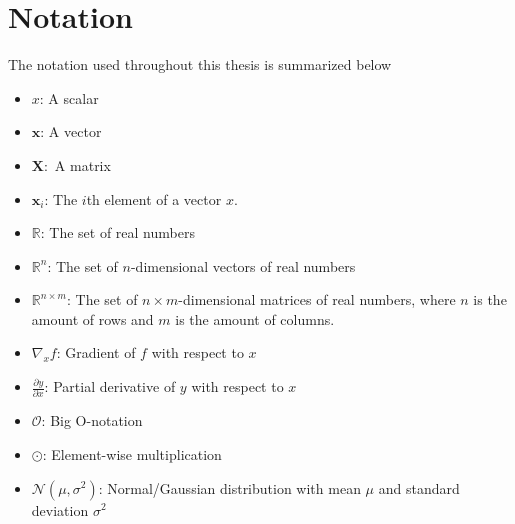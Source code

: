 \documentclass[./main.tex]{subfiles}
\begin{document}
\section{Notation}
The notation used throughout this thesis is summarized below

\begin{itemize}
    \item $x$: A scalar
    \item $\bm{x}$: A vector
    \item $\bm{X}:$ A matrix
    \item $\bm{x}_i$: The $i$th element of a vector $x$. 
    \item $\mathbb{R}$: The set of real numbers
    \item $\mathbb{R}^n$: The set of $n$-dimensional vectors of real numbers
    \item $\mathbb{R}^{n \times m}$: The set of $n \times m$-dimensional matrices of real numbers, where $n$ is the amount of rows and $m$ is the amount of columns.
    \item $\nabla_x f$: Gradient of $f$ with respect to $x$
    \item $\frac{\partial y}{\partial x}$: Partial derivative of $y$ with respect to $x$
    \item $\mathcal{O}$: Big O-notation
    \item $\odot$: Element-wise multiplication
    \item $\mathcal{N} \left(\mu, \sigma^2 \right)$: Normal/Gaussian distribution with mean $\mu$ and standard deviation $\sigma^2$
\end{itemize}
\end{document}
